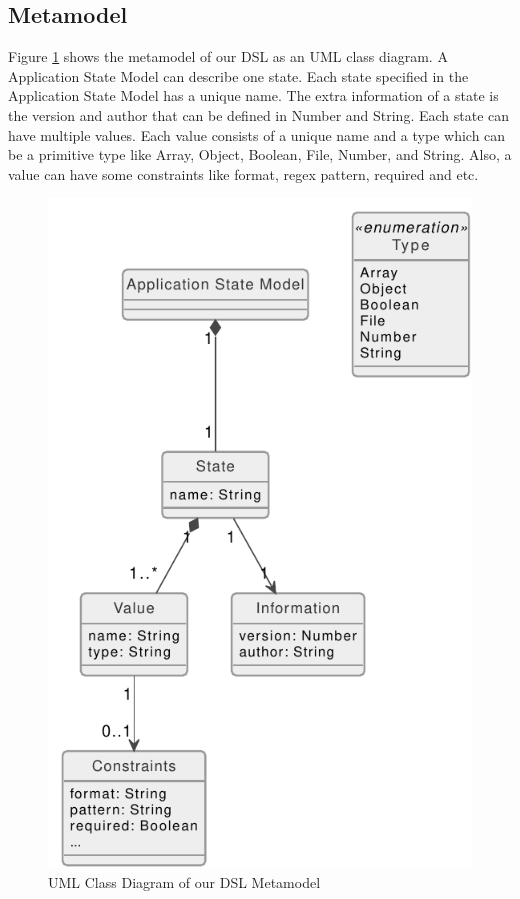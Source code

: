 \subsection{Metamodel}
Figure \ref{fig:asml-meta-model} shows the metamodel of our DSL as an UML class diagram. A Application State Model can describe one state. Each state specified in the Application State Model has a unique name. The extra information of a state is the version and author that can be defined in Number and String. Each state can have multiple values. Each value consists of a unique name and a type which can be a primitive type like Array, Object, Boolean, File, Number, and String. Also, a value can have some constraints like format, regex pattern, required and etc.

\FloatBarrier
\begin{figure}
    \includegraphics[scale=1]{../figures/asml-class-diagram.pdf}
    \centering
    \caption{UML Class Diagram of our DSL Metamodel}
    \label{fig:asml-meta-model}
\end{figure}
\FloatBarrier

